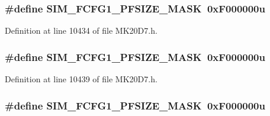 \subsubsection[{\texorpdfstring{S\+I\+M\+\_\+\+F\+C\+F\+G1\+\_\+\+P\+F\+S\+I\+Z\+E\+\_\+\+M\+A\+SK}{SIM_FCFG1_PFSIZE_MASK}}]{\setlength{\rightskip}{0pt plus 5cm}\#define S\+I\+M\+\_\+\+F\+C\+F\+G1\+\_\+\+P\+F\+S\+I\+Z\+E\+\_\+\+M\+A\+SK~0x\+F000000u}\hypertarget{group___s_i_m___register___masks_ga5adf627ba4cd9516ebf3e0a6d33aa7c5}{}\label{group___s_i_m___register___masks_ga5adf627ba4cd9516ebf3e0a6d33aa7c5}


Definition at line 10434 of file M\+K20\+D7.\+h.

\subsubsection[{\texorpdfstring{S\+I\+M\+\_\+\+F\+C\+F\+G1\+\_\+\+P\+F\+S\+I\+Z\+E\+\_\+\+M\+A\+SK}{SIM_FCFG1_PFSIZE_MASK}}]{\setlength{\rightskip}{0pt plus 5cm}\#define S\+I\+M\+\_\+\+F\+C\+F\+G1\+\_\+\+P\+F\+S\+I\+Z\+E\+\_\+\+M\+A\+SK~0x\+F000000u}\hypertarget{group___s_i_m___register___masks_ga5adf627ba4cd9516ebf3e0a6d33aa7c5}{}\label{group___s_i_m___register___masks_ga5adf627ba4cd9516ebf3e0a6d33aa7c5}


Definition at line 10439 of file M\+K20\+D7.\+h.

\subsubsection[{\texorpdfstring{S\+I\+M\+\_\+\+F\+C\+F\+G1\+\_\+\+P\+F\+S\+I\+Z\+E\+\_\+\+M\+A\+SK}{SIM_FCFG1_PFSIZE_MASK}}]{\setlength{\rightskip}{0pt plus 5cm}\#define S\+I\+M\+\_\+\+F\+C\+F\+G1\+\_\+\+P\+F\+S\+I\+Z\+E\+\_\+\+M\+A\+SK~0x\+F000000u}\hypertarget{group___s_i_m___register___masks_ga5adf627ba4cd9516ebf3e0a6d33aa7c5}{}\label{group___s_i_m___register___masks_ga5adf627ba4cd9516ebf3e0a6d33aa7c5}



